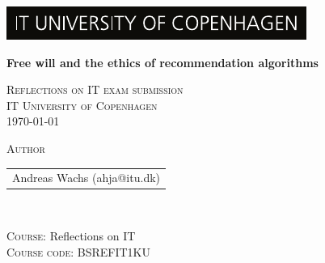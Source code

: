 \begin{titlepage}
  
  \includegraphics[width=\textwidth]{images/ITU_LOGO.pdf}
  
  \begin{center}
 
    {\Huge\textbf{Free will and the ethics of recommendation algorithms} \par}
    \vspace{1cm}
    
   \textsc{
        Reflections on IT exam submission \\
        IT University of Copenhagen \\
        \today
    }

    \vspace{2cm}

    \textsc{
        \large
        Author
    }\\
    \begin{tabular}{c}
            Andreas Wachs (ahja@itu.dk) \\
    \end{tabular}\\
    \vspace{2cm}

    \textsc{\large
        Course: 
    } Reflections on IT\\
    \textsc{\large
        Course code: 
    }
    BSREFIT1KU
    \vspace{2cm}\\

  \end{center}
  
  \vspace*{\fill}

\end{titlepage}